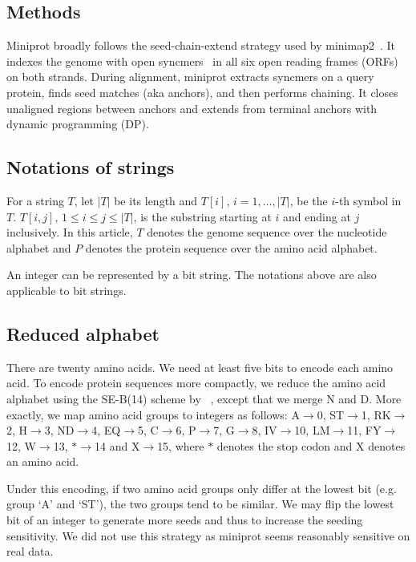 \documentclass{bioinfo}
\begin{document}
\begin{methods}
\section{Methods}

Miniprot broadly follows the seed-chain-extend strategy used by
minimap2~\citep{Li:2018ab}. It indexes the genome with open
syncmers~\citep{Edgar:2021vk} in all six open reading frames (ORFs) on both
strands. During alignment, miniprot extracts syncmers on a query protein,
finds seed matches (aka anchors), and then performs chaining. It closes
unaligned regions between anchors and extends from terminal anchors with
dynamic programming (DP).

\subsection{Notations of strings}

For a string $T$, let $|T|$ be its length and $T[i]$, $i=1,\ldots,|T|$, be
the $i$-th symbol in $T$. $T[i,j]$, $1\le i\le j\le|T|$, is the substring
starting at $i$ and ending at $j$ inclusively. In this article, $T$ denotes the
genome sequence over the nucleotide alphabet and $P$ denotes the protein
sequence over the amino acid alphabet.

An integer can be represented by a bit string. The notations above are also
applicable to bit strings.

\subsection{Reduced alphabet}

There are twenty amino acids. We need at least five bits to encode each amino
acid. To encode protein sequences more compactly, we reduce the amino acid
alphabet using the SE-B(14) scheme by ~\citet{Edgar:2004aa}, except that we
merge N and D. More exactly, we map amino acid groups to integers as
follows: A$\to$0, ST$\to$1, RK$\to$2, H$\to$3, ND$\to$4, EQ$\to$5, C$\to$6,
P$\to$7, G$\to$8, IV$\to$10, LM$\to$11, FY$\to$12, W$\to$13, $\ast$$\to$14 and
X$\to$15, where $\ast$ denotes the stop codon and X denotes an amino acid.

Under this encoding, if two amino acid groups only differ at the lowest bit
(e.g. group `A' and `ST'), the two groups tend to be similar. We may flip the
lowest bit of an integer to generate more seeds and thus to increase the
seeding sensitivity. We did not use this strategy as miniprot seems reasonably
sensitive on real data.


\end{methods}
\end{document}
